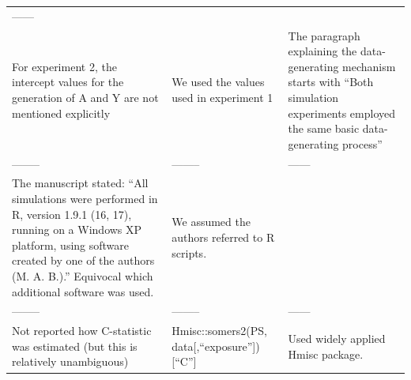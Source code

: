 \documentclass[10,a4paperpaper,]{article}
\begin{document}
\begin{longtable}[]{@{}lll@{}}
\begin{minipage}[t]{0.25\columnwidth}
------\strut
\end{minipage}\tabularnewline
\begin{minipage}[t]{0.33\columnwidth}\raggedright
For experiment 2, the intercept values for the generation of A and Y are
not mentioned explicitly\strut
\end{minipage} & \begin{minipage}[t]{0.33\columnwidth}\raggedright
We used the values used in experiment 1\strut
\end{minipage} & \begin{minipage}[t]{0.25\columnwidth}\raggedright
The paragraph explaining the data-generating mechanism starts with
``Both simulation experiments employed the same basic data-generating
process''\strut
\end{minipage}\tabularnewline
\begin{minipage}[t]{0.33\columnwidth}\raggedright
--------\strut
\end{minipage} & \begin{minipage}[t]{0.33\columnwidth}\raggedright
--------\strut
\end{minipage} & \begin{minipage}[t]{0.25\columnwidth}\raggedright
------\strut
\end{minipage}\tabularnewline
\begin{minipage}[t]{0.33\columnwidth}\raggedright
The manuscript stated: ``All simulations were performed in R, version
1.9.1 (16, 17), running on a Windows XP platform, using software created
by one of the authors (M. A. B.).'' Equivocal which additional software
was used.\strut
\end{minipage} & \begin{minipage}[t]{0.33\columnwidth}\raggedright
We assumed the authors referred to R scripts.\strut
\end{minipage} & \begin{minipage}[t]{0.25\columnwidth}\raggedright
\strut
\end{minipage}\tabularnewline
\begin{minipage}[t]{0.33\columnwidth}\raggedright
--------\strut
\end{minipage} & \begin{minipage}[t]{0.33\columnwidth}\raggedright
--------\strut
\end{minipage} & \begin{minipage}[t]{0.25\columnwidth}\raggedright
------\strut
\end{minipage}\tabularnewline
\begin{minipage}[t]{0.33\columnwidth}\raggedright
Not reported how C-statistic was estimated (but this is relatively
unambiguous)\strut
\end{minipage} & \begin{minipage}[t]{0.33\columnwidth}\raggedright
Hmisc::somers2(PS, data{[},``exposure''{]}){[}``C''{]}\strut
\end{minipage} & \begin{minipage}[t]{0.25\columnwidth}\raggedright
Used widely applied Hmisc package.\strut
\end{minipage}\tabularnewline
\bottomrule
\end{longtable}
\end{document}
